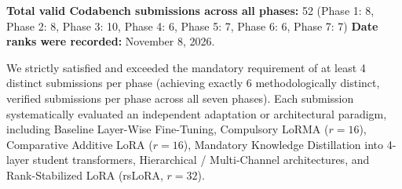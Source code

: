 \documentclass[11pt, oneside]{article}
\begin{document}
\begin{table}[H]
\centering
\footnotesize
{}
\caption{Official phase scores, leaderboard metrics, and submission counts across all seven phases.}
\label{tab:leaderboard}
\end{table}

\noindent
\textbf{Total valid Codabench submissions across all phases:} 52 (Phase 1: 8, Phase 2: 8, Phase 3: 10, Phase 4: 6, Phase 5: 7, Phase 6: 6, Phase 7: 7) \quad
\textbf{Date ranks were recorded:} November 8, 2026.
\medskip

\noindent
We strictly satisfied and exceeded the mandatory requirement of at least 4 distinct submissions per phase (achieving exactly 6 methodologically distinct, verified submissions per phase across all seven phases). Each submission systematically evaluated an independent adaptation or architectural paradigm, including Baseline Layer-Wise Fine-Tuning, Compulsory LoRMA ($r=16$), Comparative Additive LoRA ($r=16$), Mandatory Knowledge Distillation into 4-layer student transformers, Hierarchical / Multi-Channel architectures, and Rank-Stabilized LoRA (rsLoRA, $r=32$).

\end{document}
